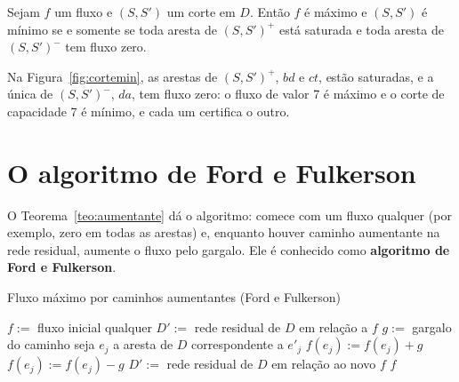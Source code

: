 \begin{cor}\label{cor:corte}
Sejam $f$ um fluxo e $(S,S')$ um corte em $D$. Então $f$ é máximo e $(S,S')$ é mínimo se e somente se toda aresta de $(S,S')^+$ está saturada e toda aresta de $(S,S')^-$ tem fluxo zero.
\end{cor}
Na Figura~\ref{fig:cortemin}, as arestas de $(S,S')^+$, $bd$ e $ct$, estão saturadas, e a única de $(S,S')^-$, $da$, tem fluxo zero: o fluxo de valor 7 é máximo e o corte de capacidade 7 é mínimo, e cada um certifica o outro.

\section{O algoritmo de Ford e Fulkerson}\label{sec:fordfulkerson}
O Teorema~\ref{teo:aumentante} dá o algoritmo: comece com um fluxo qualquer (por exemplo, zero em todas as arestas) e, enquanto houver caminho aumentante na rede residual, aumente o fluxo pelo gargalo. Ele é conhecido como \textbf{algoritmo de Ford e Fulkerson}.
\begin{pseudo}{Fluxo máximo por caminhos aumentantes (Ford e Fulkerson)}
\begin{algorithmic}
  \State $f:=$ fluxo inicial qualquer 
  \State $D':=$ rede residual de $D$ em relação a $f$
    \State $g:=$ gargalo do caminho
      \State seja $e_j$ a aresta de $D$ correspondente a $e'_j$
       \State $f(e_j):=f(e_j)+g$ \EndIf
       \State $f(e_j):=f(e_j)-g$ \EndIf
    \EndFor
    \State $D':=$ rede residual de $D$ em relação ao novo $f$
  \EndWhile
  \State \Return $f$ 
\EndFunction
\end{algorithmic}
\end{pseudo}


